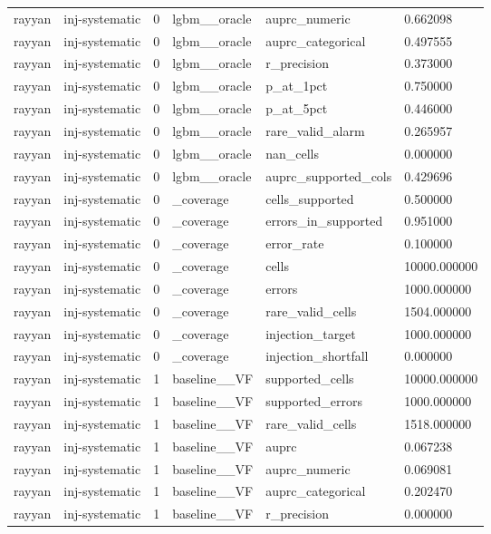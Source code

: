 \begin{tabular}{llllll}
rayyan & inj-systematic & 0 & lgbm\_\_oracle & auprc\_numeric & 0.662098 \\
rayyan & inj-systematic & 0 & lgbm\_\_oracle & auprc\_categorical & 0.497555 \\
rayyan & inj-systematic & 0 & lgbm\_\_oracle & r\_precision & 0.373000 \\
rayyan & inj-systematic & 0 & lgbm\_\_oracle & p\_at\_1pct & 0.750000 \\
rayyan & inj-systematic & 0 & lgbm\_\_oracle & p\_at\_5pct & 0.446000 \\
rayyan & inj-systematic & 0 & lgbm\_\_oracle & rare\_valid\_alarm & 0.265957 \\
rayyan & inj-systematic & 0 & lgbm\_\_oracle & nan\_cells & 0.000000 \\
rayyan & inj-systematic & 0 & lgbm\_\_oracle & auprc\_supported\_cols & 0.429696 \\
rayyan & inj-systematic & 0 & \_coverage & cells\_supported & 0.500000 \\
rayyan & inj-systematic & 0 & \_coverage & errors\_in\_supported & 0.951000 \\
rayyan & inj-systematic & 0 & \_coverage & error\_rate & 0.100000 \\
rayyan & inj-systematic & 0 & \_coverage & cells & 10000.000000 \\
rayyan & inj-systematic & 0 & \_coverage & errors & 1000.000000 \\
rayyan & inj-systematic & 0 & \_coverage & rare\_valid\_cells & 1504.000000 \\
rayyan & inj-systematic & 0 & \_coverage & injection\_target & 1000.000000 \\
rayyan & inj-systematic & 0 & \_coverage & injection\_shortfall & 0.000000 \\
rayyan & inj-systematic & 1 & baseline\_\_VF & supported\_cells & 10000.000000 \\
rayyan & inj-systematic & 1 & baseline\_\_VF & supported\_errors & 1000.000000 \\
rayyan & inj-systematic & 1 & baseline\_\_VF & rare\_valid\_cells & 1518.000000 \\
rayyan & inj-systematic & 1 & baseline\_\_VF & auprc & 0.067238 \\
rayyan & inj-systematic & 1 & baseline\_\_VF & auprc\_numeric & 0.069081 \\
rayyan & inj-systematic & 1 & baseline\_\_VF & auprc\_categorical & 0.202470 \\
rayyan & inj-systematic & 1 & baseline\_\_VF & r\_precision & 0.000000 \\

\end{tabular}
